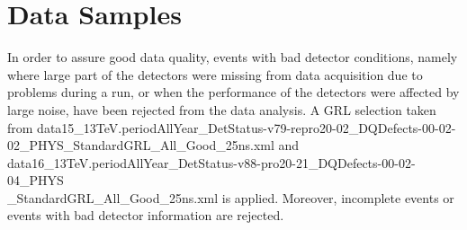 \chapter{Data Samples}

In order to assure good data quality, events with bad detector
  conditions, namely where large part of the detectors were missing
  from data acquisition due to problems during a run, or when the
  performance of the detectors were affected by large noise, have been
  rejected from the data analysis. A GRL selection taken from
  data15\_13TeV.periodAllYear\_DetStatus-v79-repro20-02\_DQDefects-00-02-02\_PHYS\_StandardGRL\_All\_Good\_25ns.xml
  and data16\_13TeV.periodAllYear\_DetStatus-v88-pro20-21\_DQDefects-00-02-04\_PHYS \\ \_StandardGRL\_All\_Good\_25ns.xml
  is applied. Moreover, incomplete events or events with bad detector information are rejected. 